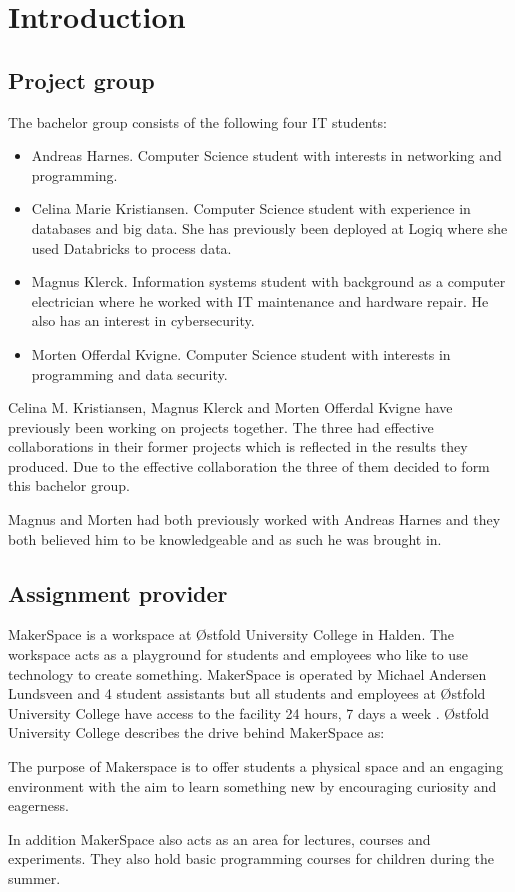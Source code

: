 \chapter{Introduction}

\section{Project group}
The bachelor group consists of the following four IT students:
\begin{itemize}
    \item Andreas Harnes. 
    Computer Science student with interests in networking and programming.
    \item Celina Marie Kristiansen.
    Computer Science student with experience in databases and big data.
    She has previously been deployed at Logiq where she used Databricks to process data.
    \item Magnus Klerck.
    Information systems student with background as a computer electrician where he worked with IT maintenance and hardware repair.
    He also has an interest in cybersecurity.
    \item Morten Offerdal Kvigne.
    Computer Science student with interests in programming and data security.
\end{itemize}
Celina M. Kristiansen, Magnus Klerck and Morten Offerdal Kvigne have previously been working on projects together.
The three had effective collaborations in their former projects which is reflected in the results they produced.
Due to the effective collaboration the three of them decided to form this bachelor group.

Magnus and Morten had both previously worked with Andreas Harnes and they both believed him to be knowledgeable and as such he was brought in.

\section{Assignment provider}
MakerSpace is a workspace at Østfold University College in Halden. 
The workspace acts as a playground for students and employees who like to use technology to create something.
MakerSpace is operated by Michael Andersen Lundsveen and 4 student assistants but all students and employees at Østfold University College have access to the facility 24 hours, 7 days a week
\cite{what-is-makerspace}.
Østfold University College describes the drive behind MakerSpace as:

\begin{displayquote}
The purpose of Makerspace is to offer students a physical space and an engaging environment with the aim to learn something new by encouraging curiosity and eagerness.
\end{displayquote}
In addition MakerSpace also acts as an area for lectures, courses and experiments.
They also hold basic programming courses for children during the summer.

